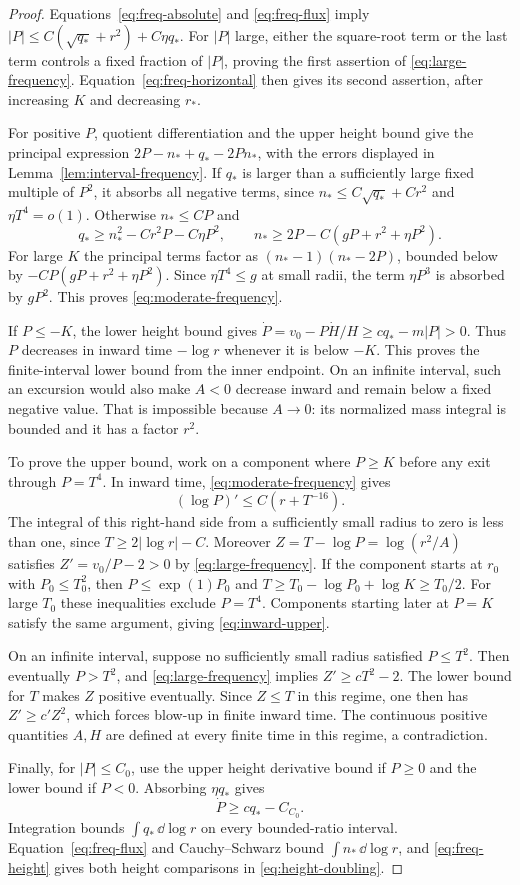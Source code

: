 \begin{proof}
Equations~\eqref{eq:freq-absolute} and \eqref{eq:freq-flux} imply
$|P|\le C(\sqrt{q_*}+r^2)+C\eta q_*$. For $|P|$ large, either
the square-root term or the last term controls a fixed fraction of
$|P|$, proving the first assertion of \eqref{eq:large-frequency}.
Equation~\eqref{eq:freq-horizontal} then gives its second assertion,
after increasing $K$ and decreasing $r_*$.

For positive $P$, quotient differentiation and the upper height bound
give the principal expression
$2P-n_*+q_*-2Pn_*$, with the errors displayed in
Lemma~\ref{lem:interval-frequency}. If $q_*$ is larger than a
sufficiently large fixed multiple of $P^2$, it absorbs all negative
terms, since $n_*\le C\sqrt{q_*}+Cr^2$ and $\eta T^4=o(1)$.
Otherwise $n_*\le CP$ and
\[
 q_*\ge n_*^2-Cr^2P-C\eta P^2,
 \qquad n_*\ge2P-C(gP+r^2+\eta P^2).
\]
For large $K$ the principal terms factor as
$ (n_*-1)(n_*-2P)$, bounded below by
$-CP(gP+r^2+\eta P^2)$. Since $\eta T^4\le g$ at small radii,
the term $\eta P^3$ is absorbed by $gP^2$. This proves
\eqref{eq:moderate-frequency}.

If $P\le-K$, the lower height bound gives
$\dot P=v_0-P\dot H/H\ge cq_*-m|P|>0$.
Thus $P$ decreases in inward time $-\log r$ whenever it is below
$-K$. This proves the finite-interval lower bound from the inner
endpoint. On an infinite interval, such an excursion would also make
$A<0$ decrease inward and remain below a fixed negative value. That is
impossible because $A\to0$: its normalized mass integral is bounded
and it has a factor $r^2$.

To prove the upper bound, work on a component where $P\ge K$ before
any exit through $P=T^4$. In inward time, \eqref{eq:moderate-frequency}
gives
\[
 (\log P)'\le C(r+T^{-16}).
\]
The integral of this right-hand side from a sufficiently small radius
to zero is less than one, since $T\ge2|\log r|-C$. Moreover
$Z=T-\log P=\log(r^2/A)$ satisfies
$Z'=v_0/P-2>0$ by \eqref{eq:large-frequency}.
If the component starts at $r_0$ with $P_0\le T_0^2$, then
$P\le\exp(1)P_0$ and $T\ge T_0-\log P_0+\log K\ge T_0/2$.
For large $T_0$ these inequalities exclude $P=T^4$.
Components starting later at $P=K$ satisfy the same argument, giving
\eqref{eq:inward-upper}.

On an infinite interval, suppose no sufficiently small radius satisfied
$P\le T^2$. Then eventually $P>T^2$, and
\eqref{eq:large-frequency} implies $Z'\ge cT^2-2$.
The lower bound for $T$ makes $Z$ positive eventually. Since $Z\le T$
in this regime, one then has $Z'\ge c'Z^2$, which forces blow-up in
finite inward time. The continuous positive quantities $A,H$ are
defined at every finite time in this regime, a contradiction.

Finally, for $|P|\le C_0$, use the upper height derivative bound if
$P\ge0$ and the lower bound if $P<0$. Absorbing $\eta q_*$ gives
\[
 \dot P\ge cq_*-C_{C_0}.
\]
Integration bounds $\int q_*\,\dd\log r$ on every bounded-ratio
interval. Equation~\eqref{eq:freq-flux} and Cauchy--Schwarz bound
$\int n_*\,\dd\log r$, and \eqref{eq:freq-height} gives both
height comparisons in \eqref{eq:height-doubling}.
\end{proof}

